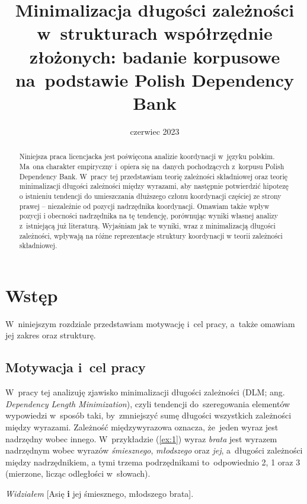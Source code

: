 \documentclass[licencjacka]{pracamgr_Kogni}
\title{Minimalizacja długości zależności w~strukturach współrzędnie złożonych: badanie korpusowe na~podstawie Polish Dependency Bank}
\date{czerwiec 2023}
\begin{document}
    \maketitle


    \begin{abstract}
        {Niniejsza praca licencjacka jest poświęcona analizie koordynacji w~języku polskim. Ma~ona charakter empiryczny i~opiera się na~danych pochodzących z~korpusu Polish Dependency Bank. W~pracy tej przedstawiam teorię zależności składniowej oraz teorię minimalizacji długości zależności między wyrazami, aby następnie potwierdzić hipotezę o istnieniu tendencji do umieszczania dłuższego członu koordynacji częściej ze strony prawej -- niezależnie od pozycji nadrzędnika koordynacji. Omawiam także wpływ pozycji i obecności nadrzędnika na tę tendencję, porównując wyniki własnej analizy z~istniejącą już literaturą. Wyjaśniam jak te wyniki, wraz z minimalizacją długości zależności, wpływają na różne reprezentacje struktury koordynacji w teorii zależności składniowej.}
    \end{abstract}

    \thispagestyle{empty}
    \setcounter{page}{3}
    \tableofcontents


    \chapter{Wstęp}\label{ch:wstep}
    W~niniejszym rozdziale przedstawiam motywację i~cel pracy, a~także omawiam jej zakres oraz strukturę.


    \section{Motywacja i~cel pracy}\label{sec:motywacja-icel-pracy}

    W~pracy tej analizuję zjawisko minimalizacji długości zależności (DLM; ang. \textit{Dependency Length Minimization}), czyli tendencji do~szeregowania elementów wypowiedzi w~sposób taki, by~zmniejszyć sumę długości wszystkich zależności między wyrazami.
    Zależność międzywyrazowa oznacza, że~jeden wyraz jest nadrzędny wobec innego.
    W~przykładzie (\ref{ex:1}) wyraz \textit{brata} jest wyrazem nadrzędnym wobec wyrazów \textit{śmiesznego}, \textit{młodszego} oraz \textit{jej}, a~długości zależności między nadrzędnikiem, a tymi trzema podrzędnikami to~odpowiednio 2, 1 oraz 3 (mierzone, licząc odległości w~słowach).
    \begin{exe}
        \ex
        \textit{Widziałem} [Asię \textbf{i} jej śmiesznego, młodszego brata].
        \label {ex:1}
    \end{exe}
\end{document}
